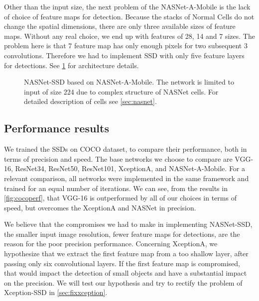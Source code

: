 Other than the input size, the next problem of the NASNet-A-Mobile is the lack of choice of feature maps for detection. Because the stacks of Normal Cells do not change the spatial dimensions, there are only three available sizes of feature maps. Without any real choice, we end up with features of 28, 14 and 7 sizes. The problem here is that 7 feature map has only enough pixels for two subsequent 3 convolutions. Therefore we had to implement SSD with only five feature layers for detections. See \cref{fig:nasnetSSD} for architecture details.


\begin{figure}
    \centering
    \nasnetSSD
    \caption[NASNet-SSD]%
    {NASNet-SSD based on NASNet-A-Mobile. The network is limited to input of size 224 due to complex structure of NASNet cells. For detailed description of cells see \cref{sec:nasnet}.}
    \label{fig:nasnetSSD}
\end{figure}

\subsection{Performance results}
We trained the SSDs on COCO dataset, to compare their performance, both in terms of precision and speed. The base networks we choose to compare are VGG-16, ResNet34, ResNet50, ResNet101, XceptionA, and NASNet-A-Mobile. For a relevant comparison, all networks were implemented in the same framework and trained for an equal number of iterations. We can see, from the results in \cref{fig:cocoperf}, that VGG-16 is outperformed by all of our choices in terms of speed, but overcomes the XceptionA and NASNet in precision. 

We believe that the compromises we had to make in implementing NASNet-SSD, the smaller input image resolution, fewer feature maps for detections, are the reason for the poor precision performance. Concerning XceptionA, we hypothesize that we extract the first feature map from a too shallow layer, after passing only six convolutional layers. If the first feature map is compromised, that would impact the detection of small objects and have a substantial impact on the precision. We will test our hypothesis and try to rectify the problem of Xception-SSD in \cref{sec:fixxception}.

